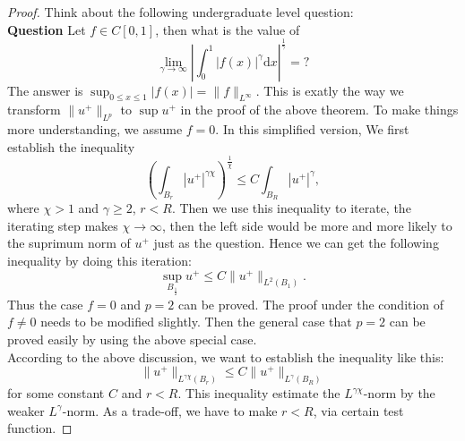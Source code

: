 \begin{proof}
Think about the following undergraduate level question:\\
{\textbf{Question}} Let $f\in C[0,1]$, then what is the value of 
  \[
    \lim_{\gamma \to \infty}\left|\int_0^1 \left| f(x) \right|^{\gamma}\mathrm{d}x\right|^{\frac{1}{\gamma}}=?
  \]
  The answer is $\sup_{0\le x\le 1}\left| f(x) \right|=\|f\|_{L^{\infty}}$.
This is exatly the way we transform  $\|u^{+}\|_{L^{p}}$ to  $\sup u^{+}$ in the proof of the  above theorem. To make things more understanding, we assume $f=0$. In this simplified version, We first establish the inequality
   \[
     \left( \int_{B_r}\left| u^{+} \right| ^{\gamma\chi} \right)^{\frac{1}{\chi}}\le C\int_{B_R}\left| u^{+} \right|^{\gamma},  
   \]  
   where $\chi>1$ and $\gamma\ge 2$, $r<R$. Then we use this inequality to iterate, the iterating step makes  $\chi\to \infty$, then the left side would be more and more likely to the suprimum norm of $u^{+}$ just as the question. Hence we can get the following inequality by doing this iteration:
   \[
     \sup_{B_{\frac{1}{2}}}u^{+}\le C \|u^{+}\|_{L^{2}(B_1)} .
   \] 
Thus the case $f=0$ and $p=2$ can be proved. The proof under the  condition of $f\neq 0$ needs to be modified slightly.
Then the general case that $p= 2$ can be proved easily by using the above special case.\\
According to the above discussion, we want to establish the inequality like this: 
\[
  \|u^{+}\|_{L^{\gamma\chi}(B_r)}\le C\|u^{+}\|_{L^{\gamma}(B_R)}
\] 
for some constant $C$ and $r<R$. This inequality estimate the  $L^{\gamma\chi}$-norm by the weaker $L^{\gamma}$-norm. As a trade-off, we have to make $r<R$, via certain test function. 


\end{proof}
